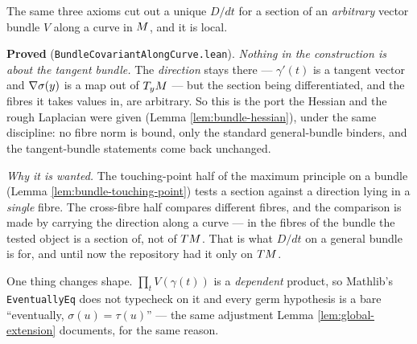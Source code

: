 \begin{lemma}
  \label{lem:bundle-cov-along-curve}
  \leanok
  The same three axioms cut out a unique $D/dt$ for a section of an
  \emph{arbitrary} vector bundle $V$ along a curve in $M$, and it is local.

  \textbf{Proved} (\texttt{BundleCovariantAlongCurve.lean}).
  \emph{Nothing in the construction is about the tangent bundle.} The
  \emph{direction} stays there --- $\gamma'(t)$ is a tangent vector and
  $\nabla\sigma(y)$ is a map out of $T_yM$ --- but the section being
  differentiated, and the fibres it takes values in, are arbitrary. So this is
  the port the Hessian and the rough Laplacian were given
  (Lemma \ref{lem:bundle-hessian}), under the same discipline: no fibre
  norm is bound, only the standard general-bundle binders, and the
  tangent-bundle statements come back unchanged.

  \emph{Why it is wanted.} The touching-point half of the maximum principle on
  a bundle (Lemma \ref{lem:bundle-touching-point}) tests a section against a
  direction lying in a \emph{single} fibre. The cross-fibre half compares
  different fibres, and the comparison is made by carrying the direction along
  a curve --- in the fibres of the bundle the tested object is a section of,
  not of $TM$. That is what $D/dt$ on a general bundle is for, and until now
  the repository had it only on $TM$.

  One thing changes shape. $\prod_t V(\gamma(t))$ is a \emph{dependent}
  product, so Mathlib's \texttt{EventuallyEq} does not typecheck on it and
  every germ hypothesis is a bare ``eventually, $\sigma(u) = \tau(u)$'' --- the
  same adjustment Lemma \ref{lem:global-extension} documents, for the same
  reason.
\end{lemma}

